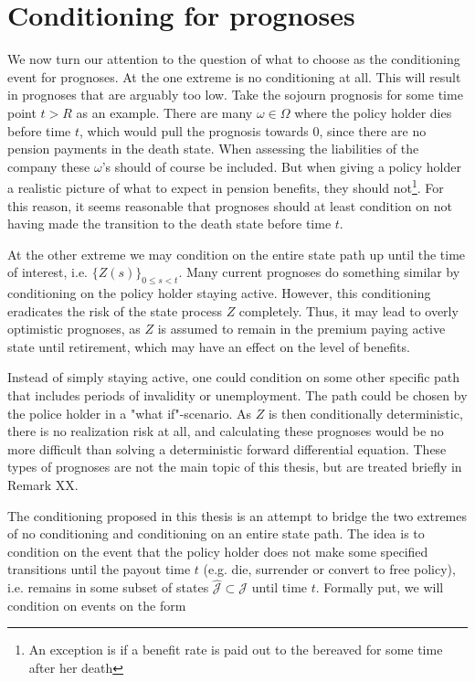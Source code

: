 \documentclass{book}
\newcommand{\1}[1]{\mathbbm{1}_{\left\lbrace #1 \right\rbrace}}
\theoremstyle{break}
\theoremstyle{remark}
\numberwithin{equation}{section}
\begin{document}
\section{Conditioning for prognoses} \label{CondForProg}

We now turn our attention to the question of what to choose as the conditioning event for prognoses. At the one extreme is no conditioning at all. This will result in prognoses that are arguably too low. Take the sojourn prognosis for some time point $t>R$ as an example. There are many $\omega \in \Omega$ where the policy holder dies before time $t$, which would pull the prognosis towards 0, since there are no pension payments in the death state. When assessing the liabilities of the company these $\omega$'s should of course be included. But when giving a policy holder a realistic picture of what to expect in pension benefits, they should not\footnote{An exception is if a benefit rate is paid out to the bereaved for some time after her death}. For this reason, it seems reasonable that prognoses should at least condition on not having made the transition to the death state before time $t$.

At the other extreme we may condition on the entire state path up until the time of interest, i.e. $\{ Z(s) \}_{0 \leq s < t}$. Many current prognoses do something similar by conditioning on the policy holder staying active. However, this conditioning eradicates the risk of the state process $Z$ completely. Thus, it may lead to overly optimistic prognoses, as $Z$ is assumed to remain in the premium paying active state until retirement, which may have an effect on the level of benefits.

Instead of simply staying active, one could condition on some other specific path that includes periods of invalidity or unemployment. The path could be chosen by the police holder in a "what if"-scenario. As $Z$ is then conditionally deterministic, there is no realization risk at all, and calculating these prognoses would be no more difficult than solving a deterministic forward differential equation. These types of prognoses are not the main topic of this thesis, but are treated briefly in Remark XX.

The conditioning proposed in this thesis is an attempt to bridge the two extremes of no conditioning and conditioning on an entire state path. The idea is to condition on the event that the policy holder does not make some specified transitions until the payout time $t$ (e.g. die, surrender or convert to free policy), i.e. remains in some subset of states $\hat{\mathcal{J}} \subset \mathcal{J}$ until time $t$. Formally put, we will condition on events on the form
\end{document}
